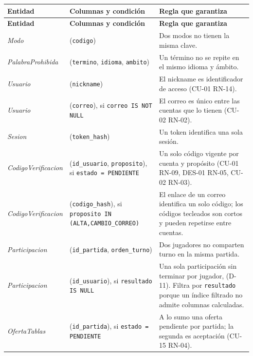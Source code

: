 \begin{center}\small
\begin{longtable}{|L{0.2\textwidth}|L{0.25\textwidth}|L{0.45\textwidth}|}
\hline
\textbf{Entidad} & \textbf{Columnas y condición} & \textbf{Regla que garantiza} \\ \hline
\endfirsthead
\hline
\textbf{Entidad} & \textbf{Columnas y condición} & \textbf{Regla que garantiza} \\ \hline
\endhead
\textit{Modo} & (\texttt{codigo}) & Dos modos no tienen la misma clave. \\ \hline
\textit{Palabra\-Prohibida} & (\texttt{termino}, \texttt{idioma}, \texttt{ambito}) & Un término no se repite en el mismo idioma y ámbito. \\ \hline
\textit{Usuario} & (\texttt{nickname}) & El nickname es identificador de acceso (\mbox{CU-01} \mbox{RN-14}). \\ \hline
\textit{Usuario} & (\texttt{correo}), si \texttt{correo IS NOT NULL} & El correo es único entre las cuentas que lo tienen (\mbox{CU-02} \mbox{RN-02}). \\ \hline
\textit{Sesion} & (\texttt{token\_\allowbreak{}hash}) & Un token identifica una sola sesión. \\ \hline
\textit{Codigo\-Verificacion} & (\texttt{id\_\allowbreak{}usuario}, \texttt{proposito}), si \texttt{estado = PENDIENTE} & Un solo código vigente por cuenta y propósito (\mbox{CU-01} \mbox{RN-09}, \mbox{DES-01} \mbox{RN-05}, \mbox{CU-02} \mbox{RN-03}). \\ \hline
\textit{Codigo\-Verificacion} & (\texttt{codigo\_\allowbreak{}hash}), si \texttt{proposito IN (ALTA,CAMBIO\_\allowbreak{}CORREO)} & El enlace de un correo identifica un solo código; los códigos tecleados son cortos y pueden repetirse entre cuentas. \\ \hline
\textit{Participacion} & (\texttt{id\_\allowbreak{}partida}, \texttt{orden\_\allowbreak{}turno}) & Dos jugadores no comparten turno en la misma partida. \\ \hline
\textit{Participacion} & (\texttt{id\_\allowbreak{}usuario}), si \texttt{resultado IS NULL} & Una sola participación sin terminar por jugador, (\mbox{D-11}). Filtra por \texttt{resultado} porque un índice filtrado no admite columnas calculadas. \\ \hline
\textit{Oferta\-Tablas} & (\texttt{id\_\allowbreak{}partida}), si \texttt{estado = PENDIENTE} & A lo sumo una oferta pendiente por partida; la segunda es aceptación (\mbox{CU-15} \mbox{RN-04}). \\ \hline

\end{longtable}
\end{center}

